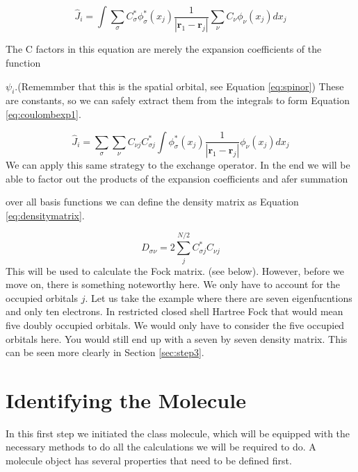 \begin{equation}\label{eq:coulombexp}
    \hat{J}_i = \int\sum_{\sigma}C^*_{\sigma}\phi^*_{\sigma}(x_j)\frac{1}{|\boldsymbol{r}_1 - \boldsymbol{r}_j|}\sum_{\nu}C_{\nu}\phi_{\nu}(x_j)dx_j
\end{equation}

The C factors in this equation are merely the expansion coefficients of the function

$\psi_i$.(Rememmber that this is the spatial orbital, see Equation \ref{eq:spinor})
These are constants, so we can safely extract them from the integrals to form
Equation \ref{eq:coulombexp1}.

\begin{equation}\label{eq:coulombexp1}
    \hat{J}_i = \sum_{\sigma}\sum_{\nu}C_{\nu j}C^*_{\sigma j}\int\phi^*_{\sigma}(x_j)\frac{1}{|\boldsymbol{r}_1 - \boldsymbol{r}_j|}\phi_{\nu}(x_j)dx_j
\end{equation}
We can apply this same strategy to the exchange operator. In the end we will be
able to factor out the products of the expansion coefficients and afer summation

over all basis functions we can define the density matrix as Equation 
\ref{eq:densitymatrix}.

\begin{equation}\label{eq:densitymatrix}
    D_{\sigma\nu} = 2\sum^{N/2}_jC_{\sigma j}^*C_{\nu j}
\end{equation}
This will be used to calculate the Fock matrix. (see below). However, before we 
move on, there is something noteworthy here. We only have to account for the 
occupied orbitals $j$. Let us take the example where there are seven eigenfucntions
and only ten electrons. In restricted closed shell Hartree Fock that would mean
five doubly occupied orbitals. We would only have to consider the five occupied
orbitals here. You would still end up with a seven by seven density matrix. This
can be seen more clearly in Section \ref{sec:step3}.

\section{Identifying the Molecule}
\label{sec:step1}
In this first step we initiated the class molecule, which will be equipped with 
the necessary methods to do all the calculations we will be required to do. 
A molecule object has several properties that need to be defined first. 


